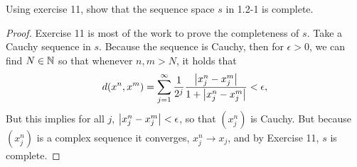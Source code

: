 \begin{exercise}{12}
Using exercise 11, show that the sequence space $s$ in 1.2-1 is complete.
\end{exercise}
\begin{proof}
Exercise 11 is most of the work to prove the completeness of $s$. Take a Cauchy sequence in $s$. Because the sequence is Cauchy, then for $\epsilon>0$, we can find $N\in\mathbb{N}$ so that whenever $n,m>N$, it holds that
\[
d(x^n,x^m)=\sum_{j=1}^\infty \frac{1}{2^j}\frac{\left\lvert x^n_j-x^m_j\right\rvert}{1+\left\lvert x^n_j-x^m_j\right\rvert}<\epsilon,
\]
But this implies for all $j$, $\left\lvert x^n_j-x^m_j\right\rvert<\epsilon$, so that $(x^n_j)$ is Cauchy. But because $(x^n_j)$ is a complex sequence it converges, $x^n_j\to x_j$, and by Exercise 11, $s$ is complete.
\end{proof}